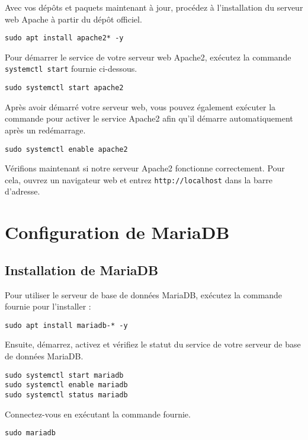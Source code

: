 Avec vos dépôts et paquets maintenant à jour, procédez à l'installation du serveur web Apache à partir du dépôt officiel.

\begin{lstlisting}
sudo apt install apache2* -y
\end{lstlisting}

Pour démarrer le service de votre serveur web Apache2, exécutez la commande \texttt{systemctl start} fournie ci-dessous.

\begin{lstlisting}
sudo systemctl start apache2
\end{lstlisting}

Après avoir démarré votre serveur web, vous pouvez également exécuter la commande pour activer le service Apache2 afin qu'il démarre automatiquement après un redémarrage.

\begin{lstlisting}
sudo systemctl enable apache2
\end{lstlisting}

Vérifions maintenant si notre serveur Apache2 fonctionne correctement. Pour cela, ouvrez un navigateur web et entrez \texttt{http://localhost} dans la barre d'adresse.

\section{Configuration de MariaDB}

\subsection{Installation de MariaDB}

Pour utiliser le serveur de base de données MariaDB, exécutez la commande fournie pour l'installer :

\begin{lstlisting}
sudo apt install mariadb-* -y
\end{lstlisting}

Ensuite, démarrez, activez et vérifiez le statut du service de votre serveur de base de données MariaDB.

\begin{lstlisting}
sudo systemctl start mariadb
sudo systemctl enable mariadb
sudo systemctl status mariadb
\end{lstlisting}

Connectez-vous en exécutant la commande fournie.
\begin{lstlisting}
sudo mariadb
\end{lstlisting}

